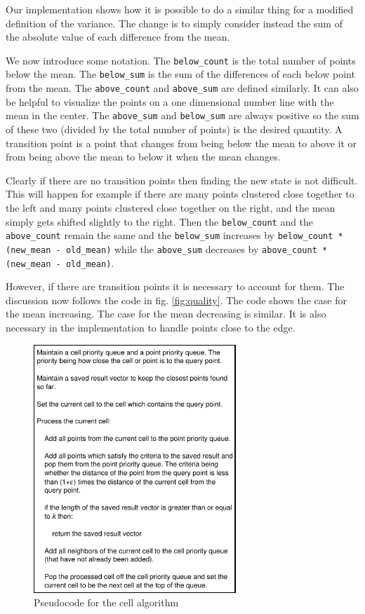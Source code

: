 \documentclass[twocolumn]{article}
\begin{document}
Our implementation shows how it is possible to do a similar
thing for a modified definition of the variance. The change is
to simply consider instead the sum of the absolute value of
each difference from the mean. 

We now introduce some notation. The \texttt{below\_count} is the total number
of points below the mean. The \texttt{below\_sum} is the sum of the
differences of each below point from the mean. The \texttt{above\_count} and
\texttt{above\_sum} are defined similarly. It can also be helpful to visualize
the points on a one dimensional number line with the mean in the center. The
\texttt{above\_sum} and \texttt{below\_sum} are always positive so the sum of
these two (divided by the total number of points) is the desired quantity. A
transition point is a point that changes from being below the mean to above it
or from being above the mean to below it when the mean changes.

Clearly if there are no transition points then finding the new state
is not difficult. This will happen for example if there are many
points clustered close together to the left and many points clustered
close together on the right, and the mean simply gets shifted slightly
to the right. Then the \texttt{below\_count} and the
\texttt{above\_count} remain the same and the \texttt{below\_sum}
increases by \texttt{below\_count * (new\_mean - old\_mean)} while the
\texttt{above\_sum} decreases by \texttt{above\_count * (new\_mean - old\_mean)}.

However, if there are transition points it is necessary to account for
them. The discussion now follows the code in fig. \ref{fig:quality}. The
code shows the case for the mean increasing. The case for the mean
decreasing is similar. It is also necessary in the implementation to
handle points close to the edge.


\begin{figure}[!t]
\centering
\includegraphics[width=3in]{cell}
\caption{Pseudocode for the cell algorithm}
\label{fig:cell}
\end{figure}
\end{document}
